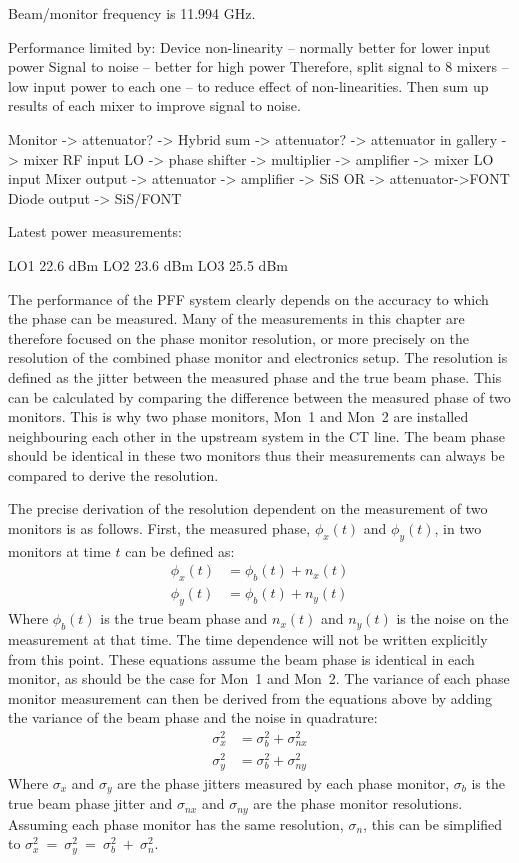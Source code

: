 Beam/monitor frequency is 11.994 GHz.

Performance limited by:
Device non-linearity -- normally better for lower input power
Signal to noise -- better for high power
Therefore, split signal to 8 mixers -- low input power to each one -- to reduce effect of non-linearities. Then sum up results of each mixer to improve signal to noise.

Monitor -> attenuator? -> Hybrid sum -> attenuator? -> attenuator in gallery -> mixer RF input
LO -> phase shifter -> multiplier -> amplifier -> mixer LO input
Mixer output -> attenuator -> amplifier -> SiS OR -> attenuator->FONT
Diode output -> SiS/FONT

Latest power measurements:

LO1 22.6 dBm
LO2 23.6 dBm
LO3 25.5 dBm


The performance of the PFF system clearly depends on the accuracy to which the phase can be measured. Many of the measurements in this chapter are therefore focused on the phase monitor resolution, or more precisely on the resolution of the combined phase monitor and electronics setup. The resolution is defined as the jitter between the measured phase and the true beam phase. This can be calculated by comparing the difference between the measured phase of two monitors. This is why two phase monitors, Mon~1 and Mon~2 are installed neighbouring each other in the upstream system in the CT line. The beam phase should be identical in these two monitors thus their measurements can always be compared to derive the resolution.

The precise derivation of the resolution dependent on the measurement of two monitors is as follows. First, the measured phase, \(\phi_x(t)\) and \(\phi_y(t)\), in two monitors at time \(t\) can be defined as:
\begin{align}
\phi_x(t) &= \phi_b(t) + n_x(t) \\
\phi_y(t) &= \phi_b(t) + n_y(t)
\end{align}
Where \(\phi_b(t)\) is the true beam phase and \(n_x(t)\) and \(n_y(t)\) is the noise on the measurement at that time. The time dependence will not be written explicitly from this point. These equations assume the beam phase is identical in each monitor, as should be the case for Mon~1 and Mon~2. The variance of each phase monitor measurement can then be derived from the equations above by adding the variance of the beam phase and the noise in quadrature:
\begin{align}
\sigma_x^2 &= \sigma_b^2 + \sigma_{nx}^2 \\
\sigma_y^2 &= \sigma_b^2 + \sigma_{ny}^2
\end{align}
Where \(\sigma_x\) and \(\sigma_y\) are the phase jitters measured by each phase monitor, \(\sigma_b\) is the true beam phase jitter and \(\sigma_{nx}\) and \(\sigma_{ny}\) are the phase monitor resolutions. Assuming each phase monitor has the same resolution, \(\sigma_n\), this can be simplified to \(\sigma_x^2~=~\sigma_y^2~=~\sigma_b^2~+~\sigma_n^2\).


